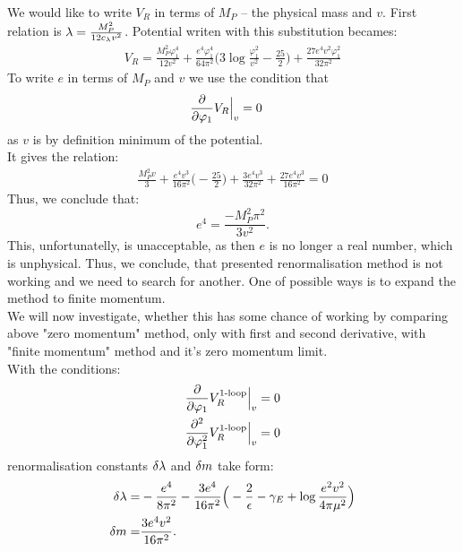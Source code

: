 We would like to write $V_R$ in terms of $M_P$ -- the physical mass and $v$.
First relation is $\lambda = \frac{M_P^2}{12c_\lambda v^2}$. Potential writen with this substitution 
becames:
\begin{align}
V_R = \frac{M_P^2\varphi_1^4}{12v^2} + \frac{e^4\varphi_1^4}{64\pi^2}\Big(3\log
\frac{\varphi_1^2}{v^2}- 
\frac{25}{2}\Big)+
\frac{27e^4v^2\varphi_1^2}{32\pi^2}
\end{align}
To write $e$ in terms of $M_P$ and $v$ we use the condition that 
\begin{align}
\frac{\partial }{\partial \varphi_1}V_R\Big|_{v} &= 0 
\end{align}
as $v$ is by definition minimum of the potential. \\
It gives the relation:
\begin{align}
\frac{M_P^2v}{3}+\frac{e^4v^3}{16\pi^2}\Big(-\frac{25}{2}\Big)+\frac{3e^4v^3}{32\pi^2}+
\frac{27e^4v^3}{16\pi^2} = 0
\end{align}
Thus, we conclude that: 
\begin{equation}
e^4=\frac{-M_P^2\pi^2}{3v^2}.
\end{equation}
This, unfortunatelly, is unacceptable, as then $e$ is no longer a real number, which is 
unphysical.
Thus, we conclude, that presented renormalisation method is not working and we need to search for 
another. One of possible ways is to expand the method to finite momentum. \\
We will now investigate, whether this has some chance of working by comparing 
above "zero momentum" method, only with first and second derivative, with "finite momentum" 
method and it's zero momentum limit. \\
With the conditions:
\begin{align}
\frac{\partial }{\partial \varphi_1}V_R^{\textrm{1-loop}}\Big|_{v} &= 0 \\
\frac{\partial^2 }{\partial \varphi_1^2}V_R^{\textrm{1-loop}}\Big|_{v} &= 0
\end{align}
renormalisation constants $\delta\lambda$ and $\delta m$ take form:
\begin{align}
\delta\lambda =& -\frac{e^4}{8\pi^2}-\frac{3e^4}{16\pi^2}\Big(-\frac{2}{\epsilon}-\gamma_E+\log{
\frac{e^2v^2}{4\pi\mu^2}}\Big)\\
\delta m =& \frac{3e^4v^2}{16\pi^2}.
\end{align}

